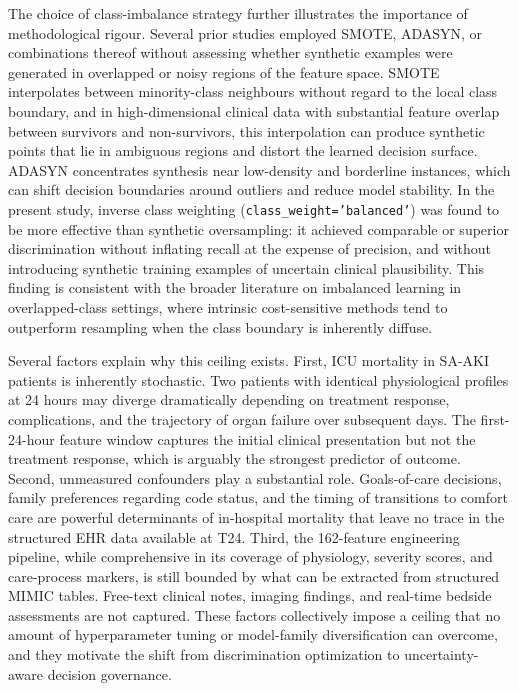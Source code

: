 The choice of class-imbalance strategy further illustrates the importance of methodological rigour. Several prior studies employed SMOTE, ADASYN, or combinations thereof without assessing whether synthetic examples were generated in overlapped or noisy regions of the feature space. SMOTE interpolates between minority-class neighbours without regard to the local class boundary, and in high-dimensional clinical data with substantial feature overlap between survivors and non-survivors, this interpolation can produce synthetic points that lie in ambiguous regions and distort the learned decision surface. ADASYN concentrates synthesis near low-density and borderline instances, which can shift decision boundaries around outliers and reduce model stability. In the present study, inverse class weighting (\texttt{class\_weight='balanced'}) was found to be more effective than synthetic oversampling: it achieved comparable or superior discrimination without inflating recall at the expense of precision, and without introducing synthetic training examples of uncertain clinical plausibility. This finding is consistent with the broader literature on imbalanced learning in overlapped-class settings, where intrinsic cost-sensitive methods tend to outperform resampling when the class boundary is inherently diffuse.\cite{He2009}

Several factors explain why this ceiling exists. First, ICU mortality in SA-AKI patients is inherently stochastic. Two patients with identical physiological profiles at 24 hours may diverge dramatically depending on treatment response, complications, and the trajectory of organ failure over subsequent days. The first-24-hour feature window captures the initial clinical presentation but not the treatment response, which is arguably the strongest predictor of outcome.\cite{Singer2016} Second, unmeasured confounders play a substantial role. Goals-of-care decisions, family preferences regarding code status, and the timing of transitions to comfort care are powerful determinants of in-hospital mortality that leave no trace in the structured EHR data available at T24.\cite{Kang2023} Third, the 162-feature engineering pipeline, while comprehensive in its coverage of physiology, severity scores, and care-process markers, is still bounded by what can be extracted from structured MIMIC tables. Free-text clinical notes, imaging findings, and real-time bedside assessments are not captured. These factors collectively impose a ceiling that no amount of hyperparameter tuning or model-family diversification can overcome, and they motivate the shift from discrimination optimization to uncertainty-aware decision governance.

